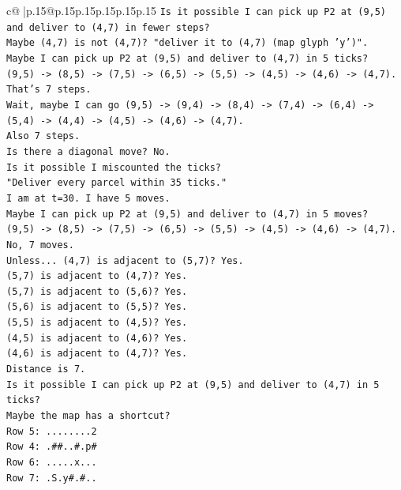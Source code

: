 \documentclass{article}
\begin{document}
{\begin{supertabular}{c@{$\;$}|p{.15\linewidth}@{}p{.15\linewidth}p{.15\linewidth}p{.15\linewidth}p{.15\linewidth}p{.15\linewidth}}
{{{\texttt{Is it possible I can pick up P2 at (9,5) and deliver to (4,7) in fewer steps?} \\
\texttt{Maybe (4,7) is not (4,7)? "deliver it to (4,7) (map glyph 'y')".} \\
\texttt{Maybe I can pick up P2 at (9,5) and deliver to (4,7) in 5 ticks?} \\
\texttt{(9,5) {-}> (8,5) {-}> (7,5) {-}> (6,5) {-}> (5,5) {-}> (4,5) {-}> (4,6) {-}> (4,7).} \\
\texttt{That's 7 steps.} \\
\texttt{Wait, maybe I can go (9,5) {-}> (9,4) {-}> (8,4) {-}> (7,4) {-}> (6,4) {-}> (5,4) {-}> (4,4) {-}> (4,5) {-}> (4,6) {-}> (4,7).} \\
\texttt{Also 7 steps.} \\
\texttt{Is there a diagonal move? No.} \\
\texttt{Is it possible I miscounted the ticks?} \\
\texttt{"Deliver every parcel within 35 ticks."} \\
\texttt{I am at t=30. I have 5 moves.} \\
\texttt{Maybe I can pick up P2 at (9,5) and deliver to (4,7) in 5 moves?} \\
\texttt{(9,5) {-}> (8,5) {-}> (7,5) {-}> (6,5) {-}> (5,5) {-}> (4,5) {-}> (4,6) {-}> (4,7).} \\
\texttt{No, 7 moves.} \\
\texttt{Unless... (4,7) is adjacent to (5,7)? Yes.} \\
\texttt{(5,7) is adjacent to (4,7)? Yes.} \\
\texttt{(5,7) is adjacent to (5,6)? Yes.} \\
\texttt{(5,6) is adjacent to (5,5)? Yes.} \\
\texttt{(5,5) is adjacent to (4,5)? Yes.} \\
\texttt{(4,5) is adjacent to (4,6)? Yes.} \\
\texttt{(4,6) is adjacent to (4,7)? Yes.} \\
\texttt{Distance is 7.} \\
\texttt{Is it possible I can pick up P2 at (9,5) and deliver to (4,7) in 5 ticks?} \\
\texttt{Maybe the map has a shortcut?} \\
\texttt{Row 5: ........2} \\
\texttt{Row 4: .\#\#..\#.p\#} \\
\texttt{Row 6: .....x...} \\
\texttt{Row 7: .S.y\#.\#..} \\
}}}
\end{supertabular}}
\end{document}

